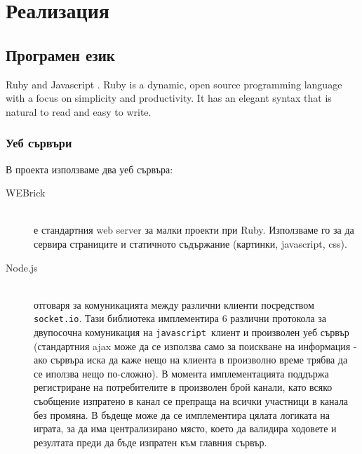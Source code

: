 \documentclass[a4paper]{article}
\def\js{\texttt{javascript}}
\begin{document}

\section{Реализация}

\subsection{Програмен език}

Ruby \cite{ruby} and Javascript \cite{javascript}.
Ruby is a dynamic, open source programming language with a focus on simplicity and productivity. It has an elegant syntax that is natural to read and easy to write.

\subsubsection{Уеб сървъри}

  В проекта използваме два уеб сървъра:
  \begin{description}
    \item[WEBrick] \hfill \\ е стандартния web server за малки проекти при Ruby. Използваме го за да сервира страниците и статичното съдържание (картинки, javascript, css).
    \item[Node.js] \hfill \\ отговаря за комуникацията между различни клиенти посредством \texttt{socket.io}. Тази библиотека имплементира 6 различни протокола за двупосочна комуникация на \js\ клиент и произволен уеб сървър (стандартния ajax може да се използва само за поискване на информация - ако сървъра иска да каже нещо на клиента в произволно време трябва да се иползва нещо по-сложно). В момента имплементацията поддържа регистриране на потребителите в произволен брой канали, като всяко съобщение изпратено в канал се препраща на всички участници в канала без промяна. В бъдеще може да се имплементира цялата логиката на играта, за да има централизирано място, което да валидира ходовете и резултата преди да бъде изпратен към главния сървър.
  \end{description}
% 
\end{document}
